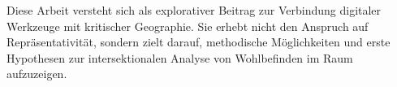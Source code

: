 Diese Arbeit versteht sich als explorativer Beitrag zur Verbindung digitaler Werkzeuge mit kritischer Geographie. Sie erhebt nicht den Anspruch auf Repräsentativität, sondern zielt darauf, methodische Möglichkeiten und erste Hypothesen zur intersektionalen Analyse von Wohlbefinden im Raum aufzuzeigen.

